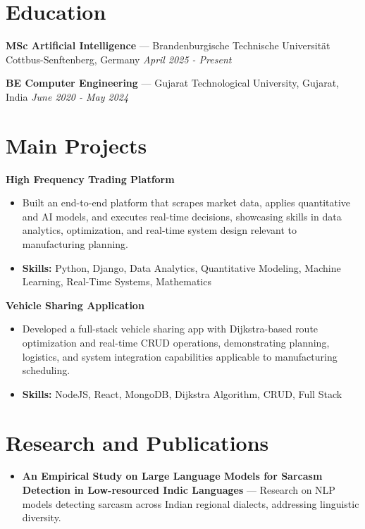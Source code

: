 \documentclass[a4paper,10pt]{article}
\begin{document}
\section*{Education}
\textbf{MSc Artificial Intelligence} — Brandenburgische Technische Universität Cottbus-Senftenberg, Germany \hfill \textit{April 2025 - Present}\par
\vspace{1.5pt}
\textbf{BE Computer Engineering} — Gujarat Technological University, Gujarat, India \hfill \textit{June 2020 - May 2024}\par

\section*{Main Projects}
\textbf{High Frequency Trading Platform}\par
\vspace{1pt}
\begin{itemize}
  \item Built an end-to-end platform that scrapes market data, applies quantitative and AI models, and executes real-time decisions, showcasing skills in data analytics, optimization, and real-time system design relevant to manufacturing planning.
  \item \textbf{Skills:} Python, Django, Data Analytics, Quantitative Modeling, Machine Learning, Real-Time Systems, Mathematics
\end{itemize}
\vspace{3pt}
\textbf{Vehicle Sharing Application}\par
\vspace{1pt}
\begin{itemize}
  \item Developed a full-stack vehicle sharing app with Dijkstra-based route optimization and real-time CRUD operations, demonstrating planning, logistics, and system integration capabilities applicable to manufacturing scheduling.
  \item \textbf{Skills:} NodeJS, React, MongoDB, Dijkstra Algorithm, CRUD, Full Stack
\end{itemize}

\section*{Research and Publications}
\begin{itemize}
\item \textbf{An Empirical Study on Large Language Models for Sarcasm Detection in Low-resourced Indic Languages} — Research on NLP models detecting sarcasm across Indian regional dialects, addressing linguistic diversity.
\end{itemize}
\end{document}

